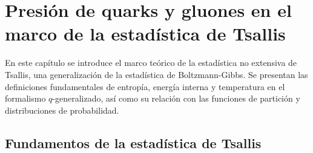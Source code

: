 \chapter{Presión de quarks y gluones en el marco de la estadística de Tsallis}\label{ch-Tsallis}


\pagestyle{fancy}
\fancyhf{} %
\fancyhead[LE]{\nouppercase{\textit{\rightmark}}} %
\fancyhead[RO]{\nouppercase{\textit{\rightmark}}} %

\begin{chaptersummary}
    En este capítulo se introduce el marco teórico de la estadística no extensiva de Tsallis, una generalización de la estadística de Boltzmann-Gibbs. Se presentan las definiciones fundamentales de entropía, energía interna y temperatura en el formalismo \( q \)-generalizado, así como su relación con las funciones de partición y distribuciones de probabilidad. 
\end{chaptersummary}

\section{Fundamentos de la estadística de Tsallis}


